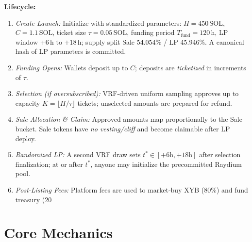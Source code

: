 \documentclass[10pt,twocolumn]{article}
\newcommand{\Hcap}{450}            %
\newcommand{\Ccap}{1.1}            %
\newcommand{\TauVal}{0.05}         %
\newcommand{\FundHours}{120}       %
\newcommand{\LPWinStart}{6}        %
\newcommand{\LPWinEnd}{18}         %
\newcommand{\SalePct}{54.054}      %
\newcommand{\LPPct}{45.946}        %
\begin{document}
\textbf{Lifecycle:}
\begin{enumerate}[label=\arabic*)]
  \item \emph{Create Launch:} Initialize with standardized parameters: $H{=}\Hcap$\,SOL, $C{=}\Ccap$\,SOL, ticket size $\tau{=}\TauVal$\,SOL, funding period $T_{\text{fund}}{=}\FundHours$\,h, LP window $+\LPWinStart$\,h to $+\LPWinEnd$\,h; supply split Sale \SalePct\% / LP \LPPct\%. A canonical hash of LP parameters is committed.
  \item \emph{Funding Opens:} Wallets deposit up to $C$; deposits are \emph{ticketized} in increments of $\tau$.
  \item \emph{Selection (if oversubscribed):} VRF-driven uniform sampling approves up to capacity $K=\lfloor H/\tau \rfloor$ tickets; unselected amounts are prepared for refund.
  \item \emph{Sale Allocation \& Claim:} Approved amounts map proportionally to the Sale bucket. Sale tokens have \emph{no vesting/cliff} and become claimable after LP deploy.
  \item \emph{Randomized LP:} A second VRF draw sets $t^\ast \in [+6\text{h}, +18\text{h}]$ after selection finalization; at or after $t^\ast$, anyone may initialize the precommitted Raydium pool.
  \item \emph{Post-Listing Fees:} Platform fees are used to market-buy \textdollar XYB (80\%) and fund treasury (20%
\end{enumerate}


\section*{Core Mechanics}
\end{document}

